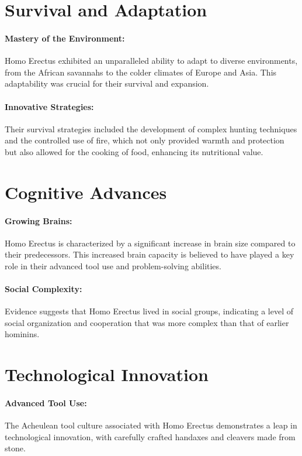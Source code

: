 \documentclass[a4paper,12pt]{book}
\begin{document}
\section*{Survival and Adaptation}

\paragraph{Mastery of the Environment:}
Homo Erectus exhibited an unparalleled ability to adapt to diverse environments, from the African savannahs to the colder climates of Europe and Asia. This adaptability was crucial for their survival and expansion.

\paragraph{Innovative Strategies:}
Their survival strategies included the development of complex hunting techniques and the controlled use of fire, which not only provided warmth and protection but also allowed for the cooking of food, enhancing its nutritional value.

\section*{Cognitive Advances}

\paragraph{Growing Brains:}
Homo Erectus is characterized by a significant increase in brain size compared to their predecessors. This increased brain capacity is believed to have played a key role in their advanced tool use and problem-solving abilities.

\paragraph{Social Complexity:}
Evidence suggests that Homo Erectus lived in social groups, indicating a level of social organization and cooperation that was more complex than that of earlier hominins.

\section*{Technological Innovation}

\paragraph{Advanced Tool Use:}
The Acheulean tool culture associated with Homo Erectus demonstrates a leap in technological innovation, with carefully crafted handaxes and cleavers made from stone.
\end{document}
